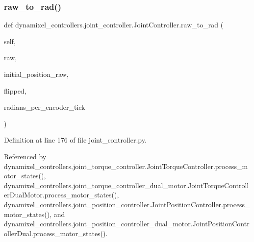 \subsubsection{\texorpdfstring{raw\+\_\+to\+\_\+rad()}{raw\_to\_rad()}}
{\footnotesize\ttfamily def dynamixel\+\_\+controllers.\+joint\+\_\+controller.\+Joint\+Controller.\+raw\+\_\+to\+\_\+rad (\begin{DoxyParamCaption}\item[{}]{self,  }\item[{}]{raw,  }\item[{}]{initial\+\_\+position\+\_\+raw,  }\item[{}]{flipped,  }\item[{}]{radians\+\_\+per\+\_\+encoder\+\_\+tick }\end{DoxyParamCaption})\hspace{0.3cm}{\ttfamily [inherited]}}



Definition at line 176 of file joint\+\_\+controller.\+py.



Referenced by dynamixel\+\_\+controllers.\+joint\+\_\+torque\+\_\+controller.\+Joint\+Torque\+Controller.\+process\+\_\+motor\+\_\+states(), dynamixel\+\_\+controllers.\+joint\+\_\+torque\+\_\+controller\+\_\+dual\+\_\+motor.\+Joint\+Torque\+Controller\+Dual\+Motor.\+process\+\_\+motor\+\_\+states(), dynamixel\+\_\+controllers.\+joint\+\_\+position\+\_\+controller.\+Joint\+Position\+Controller.\+process\+\_\+motor\+\_\+states(), and dynamixel\+\_\+controllers.\+joint\+\_\+position\+\_\+controller\+\_\+dual\+\_\+motor.\+Joint\+Position\+Controller\+Dual.\+process\+\_\+motor\+\_\+states().


